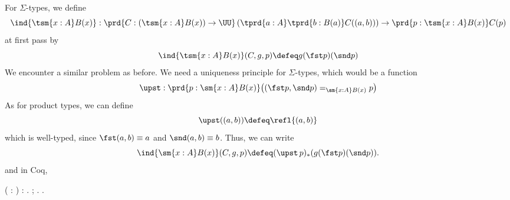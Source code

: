For $\Sigma$-types, we define
\[
\ind{\tsm{x:A}B(x)} : \prd{C:(\tsm{x:A}B(x)) \to \UU}
\left(\tprd{a:A}\tprd{b:B(a)}C((a, b))\right) \to \prd{p: \tsm{x:A}B(x)}C(p)
\]
at first pass by
\[
\ind{\tsm{x:A}B(x)}(C, g, p)
\defeq
g(\fst p)(\snd p)
\]
We encounter a similar problem as before.  We need a uniqueness principle for
$\Sigma$-types, which would be a function
\[
\upst : \prd{p : \sm{x:A}B(x)} \big(
(\fst p, \snd p) =_{\sm{x:A}B(x)} p
\big)
\]
As for product types, we can define
\[
\upst((a, b)) \defeq \refl{(a, b)}
\]
which is well-typed, since $\fst(a, b) \equiv a$ and $\snd(a, b) \equiv b$.
Thus, we can write
\[
\ind{\sm{x:A}B(x)}(C, g, p) \defeq (\upst\, p)_{*}(g(\fst p)(\snd p)).
\]
and in Coq, \begin{coqdoccode}
\coqdocemptyline
\coqdocindent{1.00em}
  ( :    ) : \coqdocnotation{(}\coqdocnotation{;} \coqdocnotation{)} \coqdocnotation{=} .  ; . .\coqdoceol
\coqdocemptyline
\coqdocindent{1.00em}

\end{coqdoccode}
